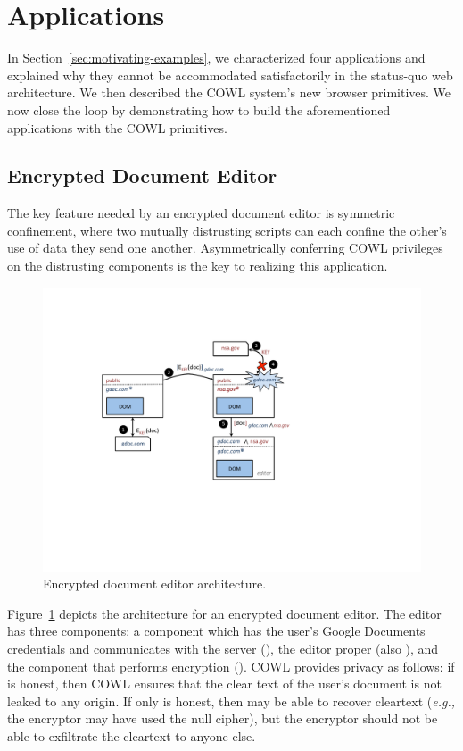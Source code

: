 \section{Applications}
\label{sec:apps}

In Section~\ref{sec:motivating-examples}, we characterized four
applications and explained why they cannot be accommodated satisfactorily
in the status-quo web architecture. We then described the COWL system's
new browser primitives. We now close the loop by demonstrating how
to build the aforementioned applications with the COWL primitives.

\subsection{Encrypted Document Editor}

The key feature needed by an encrypted document editor is symmetric
confinement, where two mutually distrusting scripts can each confine
the other's use of data they send one another. Asymmetrically
conferring COWL privileges on the distrusting components is the key to
realizing this application.

\begin{figure}
\centerline{\includegraphics[width=\columnwidth]{editor}}
\caption{\label{fig:editor} Encrypted document editor architecture.}
\end{figure}

Figure~\ref{fig:editor} depicts the architecture for an encrypted
document editor. The editor has three components: a component which
has the user's Google Documents credentials and communicates with the
server (), the editor proper (also ),
and the component that performs encryption (). COWL
provides privacy as follows: if  is honest, then COWL
ensures that the clear text of the user's document is not leaked to
any origin. If only  is honest, then 
may be able to recover cleartext (\emph{e.g.,} the encryptor may have
used the null cipher), but the encryptor should not be able to
exfiltrate the cleartext to anyone else.

